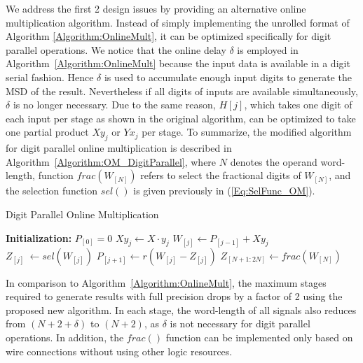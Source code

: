 \documentclass[conference]{IEEEtran}
\begin{document}
We address the first 2 design issues by providing an alternative online multiplication algorithm. Instead of simply implementing the unrolled format of Algorithm \ref{Algorithm:OnlineMult}, it can be optimized specifically for digit parallel operations. We notice that the online delay $\delta$ is employed in Algorithm~\ref{Algorithm:OnlineMult} because the input data is available in a digit serial fashion. Hence $\delta$ is used to accumulate enough input digits to generate the MSD of the result. Nevertheless if all digits of inputs are available simultaneously, $\delta$ is no longer necessary. Due to the same reason, $H[j]$, which takes one digit of each input per stage as shown in the original algorithm, can be optimized to take one partial product $Xy_j$ or $Yx_j$ per stage. To summarize, the modified algorithm for digit parallel online multiplication is described in Algorithm~\ref{Algorithm:OM_DigitParallel}, where $N$ denotes the operand word-length, function $frac(W_{[N]})$ refers to select the fractional digits of $W_{[N]}$, and the selection function $sel()$ is given previously in (\ref{Eq:SelFunc_OM}).

\begin{algorithm}[tbp]
  \caption{Digit Parallel Online Multiplication}\label{Algorithm:OM_DigitParallel}
  \begin{algorithmic}[1]
    \State \textbf{Initialization:} $P_{[0]}=0$						\vspace{.5ex}
    										\vspace{.5ex}
    	\State $Xy_j \leftarrow X \cdot y_j$						\vspace{.5ex}
    	\State $W_{[j]}    \leftarrow  P_{[j-1]} + Xy_j$			\vspace{.5ex}
     	\State $Z_{[j]}  ~      \leftarrow  sel(W_{[j]})$			\vspace{.5ex}
	 	\State $P_{[j+1]}  \leftarrow  r\left(W_{[j]}-Z_{[j]}\right)$	\vspace{.5ex}
    \EndFor															\vspace{.5ex}
    \State $Z_{[N+1:2N]} \leftarrow frac(W_{[N]})$
  \end{algorithmic}
\end{algorithm}

In comparison to Algorithm~\ref{Algorithm:OnlineMult}, the maximum stages required to generate results with full precision drops by a factor of 2 using the proposed new algorithm. In each stage, the word-length of all signals also reduces from $(N+2+\delta)$ to $(N+2)$, as $\delta$ is not necessary for digit parallel operations. In addition, the $frac()$ function can be implemented only based on wire connections without using other logic resources.
\end{document}
